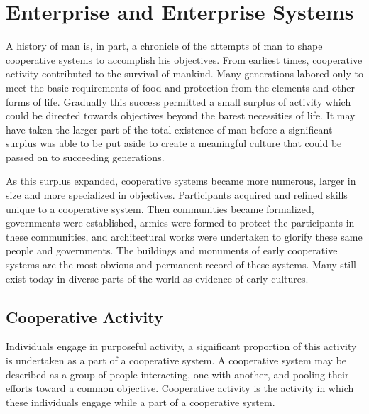 
\section{Enterprise and Enterprise Systems}

A history of man is, in part, a chronicle of the attempts of man to shape cooperative systems to accomplish his objectives. From earliest times, cooperative activity contributed to the survival of mankind. Many generations labored only to meet the basic requirements of food and protection from the elements and other forms of life. Gradually this success permitted a small surplus of activity which could be directed towards objectives beyond the barest necessities of life. It may have taken the larger part of the total existence of man before a significant surplus was able to be put aside to create a meaningful culture that could be passed on to succeeding generations.

As this surplus expanded, cooperative systems became more numerous, larger in size and more specialized in objectives. Participants acquired and refined skills unique to a cooperative system. Then communities became formalized, governments were established, armies were formed to protect the participants in these communities, and architectural works were undertaken to glorify these same people and governments. The buildings and monuments of early cooperative systems are the most obvious and permanent record of these systems. Many still exist today in diverse parts of the world as evidence of early cultures.

\subsection{Cooperative Activity}

Individuals engage in purposeful activity, a significant proportion of this activity is undertaken as a part of a cooperative system.
A cooperative system may be described as a group of people interacting, one with another, and pooling their efforts toward a common objective. Cooperative activity is the activity in which these individuals engage while a part of a cooperative system.

